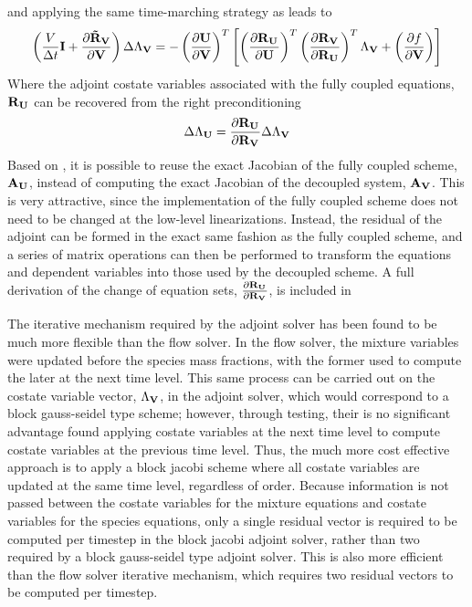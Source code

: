 and applying the same time-marching strategy as  leads to
\begin{equation}
  \left(
    \frac{V}{\Delta t} \mathbf I + \frac{\partial \mathbf{\tilde{R}_{\mathbf V}}}{\partial \mathbf V}
  \right) \Delta \Lambda_{\mathbf V}
  = -
  \left( \frac{\partial \mathbf U}{\partial \mathbf V} \right)^{T}
  \left[
    \left(\frac{\partial \mathbf R_{{\mathbf U}_{}}}{\partial \mathbf U} \right)^{T} 
    \left( \frac{\partial \mathbf R_{{\mathbf V}_{}}}{\partial \mathbf R_{{\mathbf U}_{}}} \right)^{T}
    \Lambda_{\mathbf V} 
    + \left( \frac{\partial f}{\partial \mathbf V} \right)
  \right]
  \label{adj-u-to-v-time}
\end{equation}
Where the adjoint costate variables associated with the fully coupled equations,
$\mathbf R_{{\mathbf U}_{}}$ can be recovered from the right preconditioning
\begin{equation}
  \Delta \Lambda_{\mathbf U} = \frac{\partial \mathbf R_{{\mathbf U}_{}}}{\partial \mathbf R_{{\mathbf V}_{}}} \Delta \Lambda_{\mathbf V}
  \label{adj-lam-v-to-u}
\end{equation}
Based on , it is possible to reuse the
exact Jacobian of the fully coupled scheme, $\mathbf A_{\mathbf U}$, instead of computing
the exact Jacobian of the decoupled system, $\mathbf A_{\mathbf V}$.  This is very
attractive, since the implementation of the fully coupled scheme does not need
to be changed at the low-level linearizations.  Instead, the residual of the
adjoint can be formed in the exact same fashion as the fully coupled scheme, and
a series of matrix operations can then be performed to transform the equations
and dependent variables into those used by the decoupled scheme. A full
derivation of the change of equation sets, $\frac{\partial \mathbf R_{{\mathbf U}_{}}}{\partial \mathbf R_{{\mathbf V}_{}}}$, is included
in 

The iterative mechanism required by the adjoint solver has been found to be much
more flexible than the flow solver.  In the flow solver, the mixture variables
were updated before the species mass fractions, with the former used to compute
the later at the next time level.  This same process can be carried out on the
costate variable vector, $\Lambda_{\mathbf V}$, in the adjoint solver, which would
correspond to a block gauss-seidel type scheme; however, through testing, their
is no significant advantage found applying costate variables at the next time
level to compute costate variables at the previous time level.  Thus, the much
more cost effective approach is to apply a block jacobi scheme where all
costate variables are updated at the same time level, regardless of order.
Because information is not passed between the costate variables for the mixture
equations and costate variables for the species equations, only a single
residual vector is required to be computed per timestep in the block jacobi
adjoint solver, rather than two required by a block gauss-seidel type adjoint
solver.  This is also more efficient than the flow solver iterative mechanism,
which requires two residual vectors to be computed per timestep.



